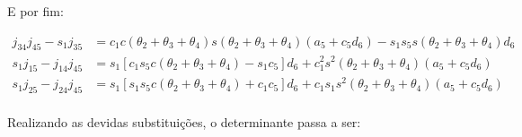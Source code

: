 E por fim:

\vspace*{-5mm}

\begin{align*}
    j_{34}j_{45} - s_1j_{35} &= c_1c(\theta_2+\theta_3+\theta_4)s(\theta_2+\theta_3+\theta_4)(a_5+c_5d_6) - s_1s_5s(\theta_2+\theta_3+\theta_4)d_6\\
    s_1j_{15} - j_{14}j_{45} &= s_1[c_1s_5c(\theta_2+\theta_3+\theta_4) - s_1c_5]d_6 + c_1^2s^2(\theta_2+\theta_3+\theta_4)(a_5+c_5d_6)\\
    s_1j_{25} - j_{24}j_{45} &= s_1[s_1s_5c(\theta_2+\theta_3+\theta_4)+c_1c_5]d_6 + c_1s_1s^2(\theta_2+\theta_3+\theta_4)(a_5+c_5d_6)\\
\end{align*}

\vspace*{-5mm}

Realizando as devidas substituições, o determinante passa a ser:

\vspace*{-5mm}

